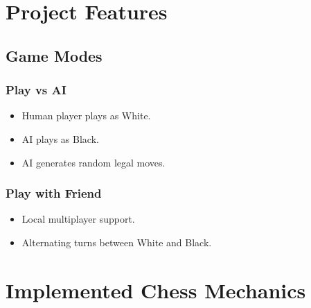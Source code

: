 \documentclass[11pt]{article}
\begin{document}

\section{Project Features}

\subsection{Game Modes}

\subsubsection{Play vs AI}

\begin{itemize}
    \item Human player plays as White.
    \item AI plays as Black.
    \item AI generates random legal moves.
\end{itemize}

\subsubsection{Play with Friend}

\begin{itemize}
    \item Local multiplayer support.
    \item Alternating turns between White and Black.
\end{itemize}


\section{Implemented Chess Mechanics}
\end{document}
